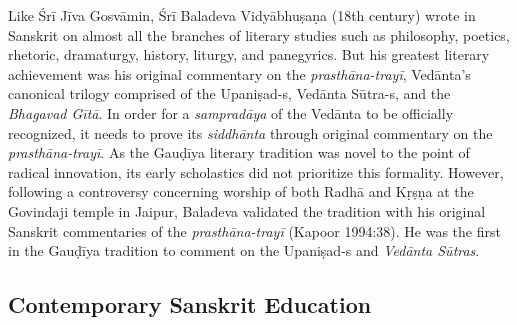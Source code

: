 Like Śrī Jīva Gosvāmin, Śrī Baladeva Vidyābhuṣaṇa (18th century) wrote in Sanskrit on almost all the branches of literary studies such as philosophy, poetics, rhetoric, dramaturgy, history, liturgy, and panegyrics. But his greatest literary achievement was his original commentary on the {\sl prasthāna-trayī}, Vedānta’s canonical trilogy comprised of the Upaniṣad-s, Vedānta Sūtra-s, and the {\sl Bhagavad Gītā}. In order for a {\sl sampradāya} of the Vedānta to be officially recognized, it needs to prove its {\sl siddhānta} through original commentary on the {\sl prasthāna-trayī}. As the Gauḍīya literary tradition was novel to the point of radical innovation, its early scholastics did not prioritize this formality. However, following a controversy concerning worship of both Radhā and Kṛṣṇa at the Govindaji temple in Jaipur, Baladeva validated the tradition with his original Sanskrit commentaries of the {\sl prasthāna-trayī} (Kapoor 1994:38). He was the first in the Gauḍīya tradition to comment on the Upaniṣad-s and {\sl Vedānta Sūtras}. 
\vskip -100pt

\subsection*{Contemporary Sanskrit Education}
\vskip -5pt


